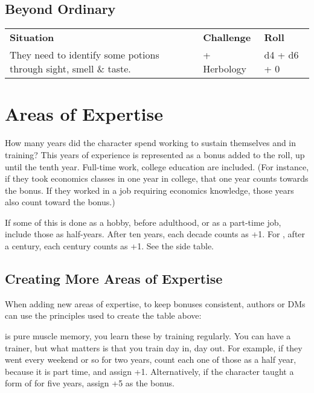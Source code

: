 \subsection*{Beyond Ordinary}

\begin{center}
	\begin{xltabular}{\textwidth}{Xll}
		\textbf{Situation}													& \textbf{Challenge} 								& \textbf{Roll} \\
		They need to identify some potions through sight, smell \& taste. 	&  + Herbology		& d4 + d6 + 0 \\
	\end{xltabular}
\end{center}





\section{Areas of Expertise}

\label{subsec:areas_of_expertise}

How many years did the character spend working to sustain themselves and in training?
This years of experience is represented as a bonus added to the roll, up until the tenth year.
Full-time work, college education are included.
(For instance, if they took economics classes in one year in college, that one year counts towards the bonus.
If they worked in a job requiring economics knowledge, those years also count toward the bonus.)

If some of this is done as a hobby, before adulthood, or as a part-time job, include those as half-years.
After ten years, each decade counts as +1. For ,
after a century, each century counts as +1. See the side table.

\subsection{Creating More Areas of Expertise}

When adding new areas of expertise, to keep bonuses consistent,
authors or DMs can use the principles used to create the table above:

 is pure muscle memory, you learn these by training regularly.
You can have a trainer, but what matters is that you train day in, day out.
For example, if they went  every weekend or so for two years, count each one of those as a half year, because it is part time, and assign +1.
Alternatively, if the character taught a form of  for five years, assign +5 as the bonus.\par

